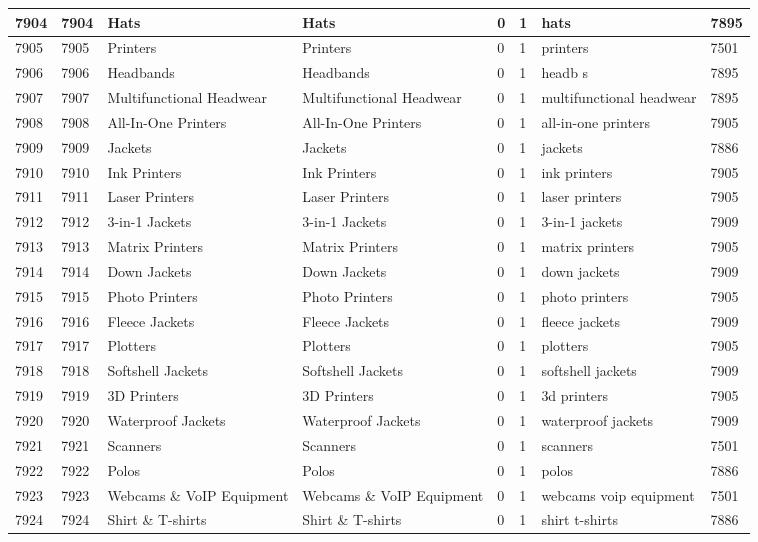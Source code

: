 \begin{longtable}{|l|l|l|l|l|l|l|l|}
7904 & 7904 & Hats & Hats & 0 & 1 & hats & 7895 \\ \hline 
7905 & 7905 & Printers & Printers & 0 & 1 & printers & 7501 \\ \hline 
7906 & 7906 & Headbands & Headbands & 0 & 1 & headb s & 7895 \\ \hline 
7907 & 7907 & Multifunctional Headwear & Multifunctional Headwear & 0 & 1 & multifunctional headwear & 7895 \\ \hline 
7908 & 7908 & All-In-One Printers & All-In-One Printers & 0 & 1 & all-in-one printers & 7905 \\ \hline 
7909 & 7909 & Jackets & Jackets & 0 & 1 & jackets & 7886 \\ \hline 
7910 & 7910 & Ink Printers & Ink Printers & 0 & 1 & ink printers & 7905 \\ \hline 
7911 & 7911 & Laser Printers & Laser Printers & 0 & 1 & laser printers & 7905 \\ \hline 
7912 & 7912 & 3-in-1 Jackets & 3-in-1 Jackets & 0 & 1 & 3-in-1 jackets & 7909 \\ \hline 
7913 & 7913 & Matrix Printers & Matrix Printers & 0 & 1 & matrix printers & 7905 \\ \hline 
7914 & 7914 & Down Jackets & Down Jackets & 0 & 1 & down jackets & 7909 \\ \hline 
7915 & 7915 & Photo Printers & Photo Printers & 0 & 1 & photo printers & 7905 \\ \hline 
7916 & 7916 & Fleece Jackets & Fleece Jackets & 0 & 1 & fleece jackets & 7909 \\ \hline 
7917 & 7917 & Plotters & Plotters & 0 & 1 & plotters & 7905 \\ \hline 
7918 & 7918 & Softshell Jackets & Softshell Jackets & 0 & 1 & softshell jackets & 7909 \\ \hline 
7919 & 7919 & 3D Printers & 3D Printers & 0 & 1 & 3d printers & 7905 \\ \hline 
7920 & 7920 & Waterproof Jackets & Waterproof Jackets & 0 & 1 & waterproof jackets & 7909 \\ \hline 
7921 & 7921 & Scanners & Scanners & 0 & 1 & scanners & 7501 \\ \hline 
7922 & 7922 & Polos & Polos & 0 & 1 & polos & 7886 \\ \hline 
7923 & 7923 & Webcams \& VoIP Equipment & Webcams \& VoIP Equipment & 0 & 1 & webcams voip equipment & 7501 \\ \hline 
7924 & 7924 & Shirt \& T-shirts & Shirt \& T-shirts & 0 & 1 & shirt t-shirts & 7886 \\ \hline 

\end{longtable}
